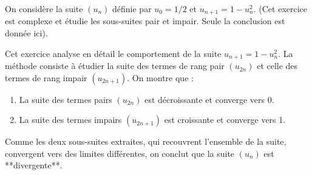 \documentclass[solutions]{exercices}
\begin{document}
\begin{exercice}[\st]
On considère la suite $(u_n)$ définie par $u_0=1/2$ et $u_{n+1}=1-u_n^2$.
(Cet exercice est complexe et étudie les sous-suites pair et impair. Seule la conclusion est donnée ici).
\end{exercice}
\begin{solution}
Cet exercice analyse en détail le comportement de la suite $u_{n+1}=1-u_n^2$. La méthode consiste à étudier la suite des termes de rang pair $(u_{2n})$ et celle des termes de rang impair $(u_{2n+1})$.
On montre que :
\begin{enumerate}
    \item La suite des termes pairs $(u_{2n})$ est décroissante et converge vers 0.
    \item La suite des termes impairs $(u_{2n+1})$ est croissante et converge vers 1.
\end{enumerate}
Comme les deux sous-suites extraites, qui recouvrent l'ensemble de la suite, convergent vers des limites différentes, on conclut que la suite $(u_n)$ est **divergente**.
\end{solution}
\end{document}
